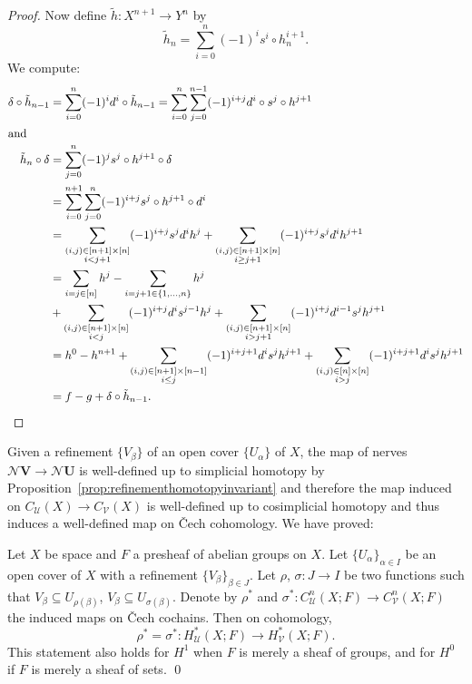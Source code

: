 \documentclass[a4paper,openany]{scrbook}
\newcommand{\nerve}{\mathcal N}
\begin{document}
\begin{proof}
Now define $\tilde h\colon X^{n+1} \to Y^n$ by
\[
\tilde h_n = \sum_{i=0}^n (-1)^i s^i \circ h_n^{i+1}.
\]
We compute:
\begin{align*}
\delta \circ \tilde h_{n-1} &= \sum_{i=0}^{n} (-1)^i d^i \circ \tilde h_{n-1} = \sum_{i=0}^{n} \sum_{j=0}^{n-1} (-1)^{i+j} d^i \circ s^j \circ h^{j+1}\\
\intertext{and}
\tilde h_n \circ \delta &= \sum_{j=0}^{n} (-1)^j s^j \circ h^{j+1} \circ \delta\\
&= \sum_{i=0}^{n+1} \sum_{j=0}^{n} (-1)^{i+j} s^j \circ h^{j+1} \circ d^i\\
&= \sum_{\substack{(i,j) \in [n+1] \times [n]\\i< j+1}} (-1)^{i+j} s^j d^i h^j + \sum_{\substack{(i,j) \in [n+1] \times [n]\\i\geq j+1}} (-1)^{i+j} s^j d^i h^{j+1}\\
&= \sum_{i=j \in [n]} h^j - \sum_{i=j+1 \in \{1,\dots,n\}} h^j\\
& + \sum_{\substack{(i,j) \in [n+1] \times [n]\\i < j}} (-1)^{i+j} d^i s^{j-1} h^j + \sum_{\substack{(i,j) \in [n+1] \times [n]\\i> j+1}} (-1)^{i+j} d^{i-1} s^j h^{j+1}\\
& = h^0-h^{n+1} + \sum_{\substack{(i,j) \in [n+1] \times [n-1]\\i \leq j}} (-1)^{i+j+1} d^i s^{j} h^{j+1} + \sum_{\substack{(i,j) \in [n] \times [n]\\i> j}} (-1)^{i+j+1} d^{i} s^j h^{j+1}\\
&= f-g + \delta \circ \tilde h_{n-1}. 
\end{align*}
\end{proof}

Given a refinement $\{V_\beta\}$ of an open cover $\{U_\alpha\}$ of $X$, the map of nerves $\nerve \mathbf V \to \nerve \mathbf U$ is well-defined up to simplicial homotopy by Proposition~\ref{prop:refinementhomotopyinvariant} and therefore the map induced on $C_{\mathcal U}(X) \to C_{\mathcal V}(X)$ is well-defined up to cosimplicial homotopy and thus induces a well-defined map on Čech cohomology. We have proved:

\begin{thm}\label{thm:welldefinedrefinement}
Let $X$ be space and $F$ a presheaf of abelian groups on $X$.
Let $\{U_\alpha\}_{\alpha \in I}$ be an open cover of $X$ with a refinement $\{V_\beta\}_{\beta \in J}$. Let $\rho$, $\sigma\colon J \to I$ be two functions such that $V_{\beta} \subseteq U_{\rho(\beta)}$, $V_\beta \subseteq U_{\sigma(\beta)}$. Denote by $\rho^*$ and $\sigma^*\colon C^n_{\mathcal U}(X;F) \to C^n_{\mathcal V}(X;F)$ the induced maps on Čech cochains. Then on cohomology,
\[
\rho^* = \sigma^*\colon H^*_{\mathcal U}(X;F) \to H^*_{\mathcal V}(X;F).
\]
This statement also holds for $H^1$ when $F$ is merely a sheaf of groups, and for $H^0$ if $F$ is merely a sheaf of sets.
\qed
\end{thm}
\end{document}
